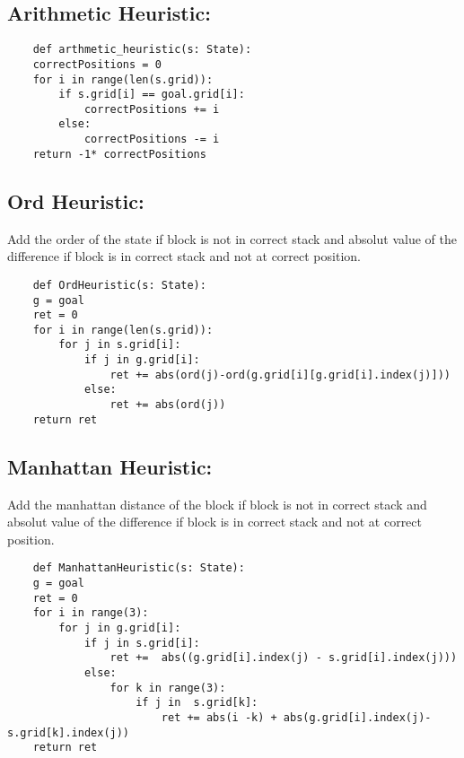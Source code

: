 \documentclass{article}
\begin{document}
\subsection{Arithmetic Heuristic: }
\begin{verbatim}
    def arthmetic_heuristic(s: State):
    correctPositions = 0
    for i in range(len(s.grid)):
        if s.grid[i] == goal.grid[i]:
            correctPositions += i
        else:
            correctPositions -= i
    return -1* correctPositions
\end{verbatim}

\subsection{Ord Heuristic: }
Add the order of the state if block is not in correct stack and absolut value of the difference if block is in correct stack and not at correct position.

\begin{verbatim}
    def OrdHeuristic(s: State):
    g = goal
    ret = 0
    for i in range(len(s.grid)):
        for j in s.grid[i]:
            if j in g.grid[i]:
                ret += abs(ord(j)-ord(g.grid[i][g.grid[i].index(j)]))
            else:
                ret += abs(ord(j))
    return ret
\end{verbatim}

\subsection{Manhattan Heuristic: }
Add the manhattan distance of the block if block is not in correct stack and absolut value of the difference if block is in correct stack and not at correct position.

\begin{verbatim}
    def ManhattanHeuristic(s: State):
    g = goal
    ret = 0
    for i in range(3):
        for j in g.grid[i]:
            if j in s.grid[i]:
                ret +=  abs((g.grid[i].index(j) - s.grid[i].index(j)))
            else:
                for k in range(3):
                    if j in  s.grid[k]:
                        ret += abs(i -k) + abs(g.grid[i].index(j)-s.grid[k].index(j))
    return ret
\end{verbatim}
\end{document}
